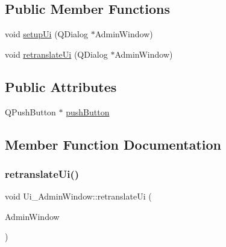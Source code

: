 \subsection*{Public Member Functions}
\begin{DoxyCompactItemize}
\item 
void \hyperlink{class_ui___admin_window_a66b389d6b188fbaca3e2e8af08e373e0}{setup\+Ui} (Q\+Dialog $\ast$Admin\+Window)
\item 
void \hyperlink{class_ui___admin_window_a2c1707ce7053e1f0924398e5638b6dda}{retranslate\+Ui} (Q\+Dialog $\ast$Admin\+Window)
\end{DoxyCompactItemize}
\subsection*{Public Attributes}
\begin{DoxyCompactItemize}
\item 
Q\+Push\+Button $\ast$ \hyperlink{class_ui___admin_window_aa4507cd98cd8c7e67cdfc68d4d558a67}{push\+Button}
\end{DoxyCompactItemize}


\subsection{Member Function Documentation}
\mbox{\label{class_ui___admin_window_a2c1707ce7053e1f0924398e5638b6dda}} 
\subsubsection{\texorpdfstring{retranslate\+Ui()}{retranslateUi()}}
{\footnotesize\ttfamily void Ui\+\_\+\+Admin\+Window\+::retranslate\+Ui (\begin{DoxyParamCaption}\item[{Q\+Dialog $\ast$}]{Admin\+Window }\end{DoxyParamCaption})\hspace{0.3cm}{\ttfamily [inline]}}

\mbox{\label{class_ui___admin_window_a66b389d6b188fbaca3e2e8af08e373e0}} 
